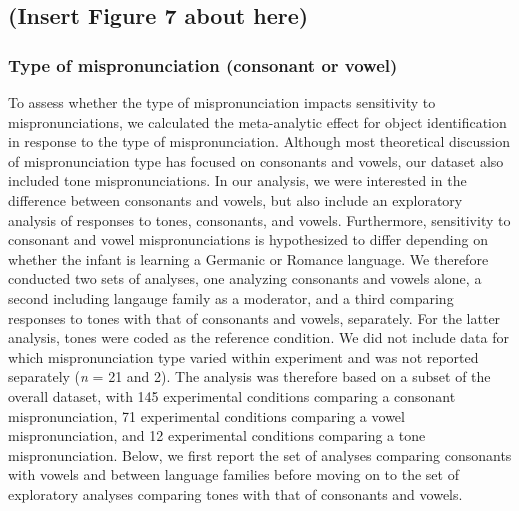 \documentclass[man]{apa6}
\begin{document}
\hypertarget{insert-figure-7-about-here-1}{%
\subsection{(Insert Figure 7 about here)}\label{insert-figure-7-about-here-1}}

\hypertarget{type-of-mispronunciation-consonant-or-vowel}{%
\subsubsection{Type of mispronunciation (consonant or vowel)}\label{type-of-mispronunciation-consonant-or-vowel}}

To assess whether the type of mispronunciation impacts sensitivity to mispronunciations, we calculated the meta-analytic effect for object identification in response to the type of mispronunciation. Although most theoretical discussion of mispronunciation type has focused on consonants and vowels, our dataset also included tone mispronunciations. In our analysis, we were interested in the difference between consonants and vowels, but also include an exploratory analysis of responses to tones, consonants, and vowels. Furthermore, sensitivity to consonant and vowel mispronunciations is hypothesized to differ depending on whether the infant is learning a Germanic or Romance language. We therefore conducted two sets of analyses, one analyzing consonants and vowels alone, a second including langauge family as a moderator, and a third comparing responses to tones with that of consonants and vowels, separately. For the latter analysis, tones were coded as the reference condition. We did not include data for which mispronunciation type varied within experiment and was not reported separately (\emph{n} = 21 and 2). The analysis was therefore based on a subset of the overall dataset, with 145 experimental conditions comparing a consonant mispronunciation, 71 experimental conditions comparing a vowel mispronunciation, and 12 experimental conditions comparing a tone mispronunciation. Below, we first report the set of analyses comparing consonants with vowels and between language families before moving on to the set of exploratory analyses comparing tones with that of consonants and vowels.
\end{document}
